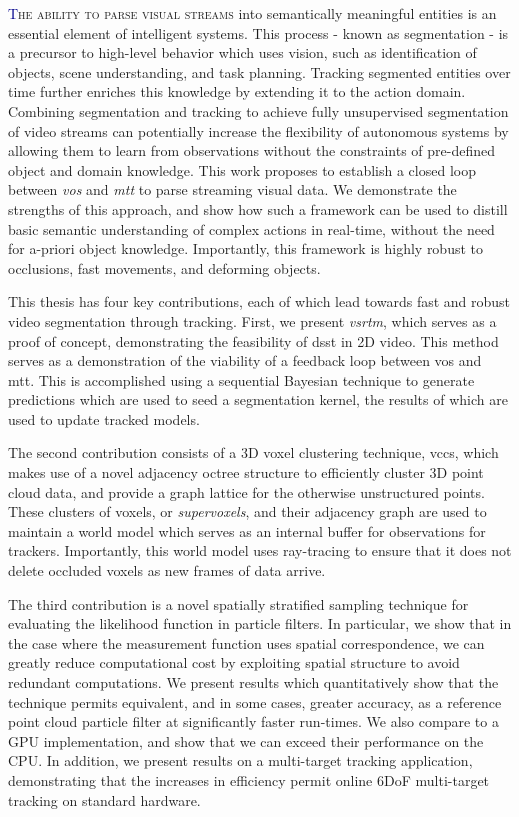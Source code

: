 \lettrine[lines=2, loversize=0.3]{\textcolor{DarkBlue}T}{he ability to parse visual streams} into semantically meaningful entities is an essential element of intelligent systems. This process - known as segmentation - is a precursor to high-level behavior which uses vision, such as identification of objects, scene understanding, and task planning. Tracking segmented entities over time further enriches this knowledge by extending it to the action domain. Combining segmentation and tracking to achieve fully unsupervised segmentation of video streams can potentially increase the flexibility of autonomous systems by allowing them to learn from observations without the constraints of pre-defined object and domain knowledge. This work proposes to establish a closed loop between \emph{\gls{vos}} and \emph{\gls{mtt}} to parse streaming visual data. We demonstrate the strengths of this approach, and show how such a framework can be used to distill basic semantic understanding of complex actions in real-time, without the need for a-priori object knowledge. Importantly, this framework is highly robust to occlusions, fast movements, and deforming objects. 

This thesis has four key contributions, each of which lead towards fast and robust video segmentation through tracking. First, we present \emph{\gls{vsrtm}}, which serves as a proof of concept, demonstrating the feasibility of \gls{dsst} in 2D video. This method serves as a demonstration of the viability of a feedback loop between \gls{vos} and \gls{mtt}. This is accomplished using a sequential Bayesian technique to generate predictions which are used to seed a segmentation kernel, the results of which are used to update tracked models. 

The second contribution consists of a 3D voxel clustering technique, \gls{vccs}, which makes use of a novel adjacency octree structure to efficiently cluster 3D point cloud data, and provide a graph lattice for the otherwise unstructured points. These clusters of voxels, or \emph{supervoxels}, and their adjacency graph are used to maintain a world model which serves as an internal buffer for observations for trackers. Importantly, this world model uses ray-tracing to ensure that it does not delete occluded voxels as new frames of data arrive.

The third contribution is a novel spatially stratified sampling technique for evaluating the likelihood function in particle filters. In particular, we show that in the case where the measurement function uses spatial correspondence, we can greatly reduce computational cost by exploiting spatial structure to avoid redundant computations. We present results which quantitatively show that the technique permits equivalent, and in some cases, greater accuracy, as a reference point cloud particle filter at significantly faster run-times. We also compare to a GPU implementation, and show that we can exceed their performance on the CPU. In addition, we present results on a multi-target tracking application, demonstrating that the increases in efficiency permit online 6DoF multi-target tracking on standard hardware.

